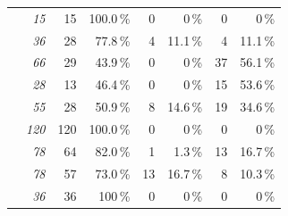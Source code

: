{\begin{table}
\begin{tabular}{p{1.1cm}rrrrrrr}
	\jumper & \textit{15} &
	\cellcolor{lt-color!100!white}15 & \cellcolor{lt-color!100!white}100.0\,\% & 
	0 & 0\,\% & 
	0 & 0\,\%\\
	
	\kanzi & \textit{36} &
	\cellcolor{lt-color!78!white}28 & \cellcolor{lt-color!78!white}77.8\,\% & 
	\cellcolor{xmt-color!11!white}	4& \cellcolor{xmt-color!11!white}11.1\,\% & 
	\cellcolor{nmt-color!11!white}4 & \cellcolor{nmt-color!11!white}11.1\,\%\\
	
	\dconvert & \textit{66} &
	\cellcolor{lt-color!43!white}29 & \cellcolor{lt-color!43!white}43.9\,\% & 
	0 & 0\,\% & 
	\cellcolor{nmt-color!56!white}37 & \cellcolor{nmt-color!56!white}56.1\,\%\\
	
	\htwo & \textit{28} &
	\cellcolor{lt-color!47!white}13 & \cellcolor{lt-color!47!white}46.4\,\% & 
	0 & 0\,\% & 
	\cellcolor{nmt-color!53!white}15 & \cellcolor{nmt-color!53!white}53.6\,\%\\
	
	\batik & \textit{55} &
	\cellcolor{lt-color!50!white}28 & \cellcolor{lt-color!50!white}50.9\,\% & 
	\cellcolor{xmt-color!14!white}8 & \cellcolor{xmt-color!14!white}14.6\,\% & 
	\cellcolor{nmt-color!34!white}19 & \cellcolor{nmt-color!34!white}34.6\,\%\\
	
	\jadx & \textit{120} &
	\cellcolor{lt-color!100!white}120 & \cellcolor{lt-color!100!white}100.0\,\% & 
	0 & 0\,\% & 
	0 & 0\,\%\\
	
	\midrule
	
	\rowcolor{black}	\xz & \textit{78} &
	\cellcolor{lt-color!82!white}64 & \cellcolor{lt-color!82!white}82.0\,\% & 
	\cellcolor{xmt-color!1!white}1 & \cellcolor{xmt-color!1!white}1.3\,\% & 
	\cellcolor{nmt-color!16!white}13 & \cellcolor{nmt-color!16!white}16.7\,\%\\
	
		\lrzip & \textit{78} &
	\cellcolor{lt-color!73!white}57 & \cellcolor{lt-color!73!white}73.0\,\% & 
	\cellcolor{xmt-color!16!white}13 & \cellcolor{xmt-color!16!white}16.7\,\% & 
	\cellcolor{nmt-color!10!white}8 & \cellcolor{nmt-color!10!white}10.3\,\%\\
	
	\xzwo & \textit{36} &
	\cellcolor{lt-color!100!white}36 & \cellcolor{lt-color!100!white}100\,\% & 
	0 & 0\,\% & 
	0 & 0\,\%\\
	

\end{tabular}
\end{table}}
